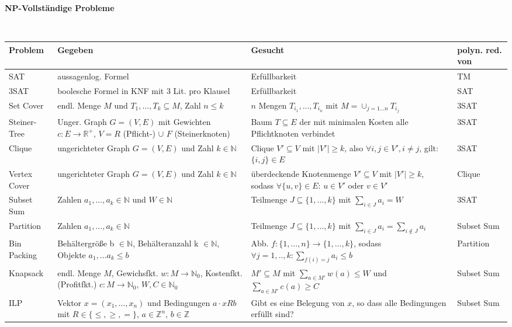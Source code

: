 \documentclass{article}
\newcommand{\h}[1]{\vspace{1ex}\begin{center}\small\textbf{#1}\end{center}}
\begin{document}
\pagebreak
\scriptsize\raggedright
\h{NP-Vollständige Probleme}\
		\begin{tabular}{p{1.6cm}p{6cm}p{6cm}p{1.8cm}}
		Problem 		&		Gegeben		&		Gesucht		& polyn. red. von \\ \hline
		SAT					& aussagenlog. Formel & Erfüllbarkeit & TM\\
		3SAT				& boolesche Formel in KNF mit 3 Lit. pro Klausel & Erfüllbarkeit & SAT \\
		Set Cover		& endl. Menge $M$ und $T_1,...,T_k \subseteq M$, Zahl $n \leq k$	&  $n$ Mengen $T_{i_1},...,T_{i_n}$ mit $M=\cup_{j=1\ldots n}T_{i_j}$ & 3SAT \\
		Steiner-Tree& Unger.	Graph $G=(V,E)$ mit Gewichten $c:E \rightarrow \mathbb{R}^+$, $V=R$ (Pflicht-) $\cup$ $F$ (Steinerknoten)	&	Baum $T \subseteq E$ der mit minimalen Kosten alle Pflichtknoten verbindet& 3SAT \\
		Clique			&	ungerichteter Graph $G=(V,E)$ und Zahl $k \in \mathbb{N}$ & Clique $V'\subseteq V$ mit $|V'|\ge k$, also $\forall i,j \in V', i \neq j$, gilt: $\{i,j\} \in E$ & 3SAT \\
		Vertex Cover&	ungerichteter Graph $G=(V,E)$ und Zahl $k \in \mathbb{N}$ &	überdeckende Knotenmenge $V'\subseteq V$ mit $\left| V' \right| \geq k$, sodass $\forall \{u,v\} \in E$: $u \in V'$ oder $v \in V'$	& Clique \\
		Subset Sum & Zahlen $a_1,...,a_k \in \mathbb{N}$ und $W \in \mathbb{N}$ &	Teilmenge $J \subseteq \{1,...,k \}$ mit $\sum_{i \in J}{a_i}=W$ & 3SAT \\ 
		Partition		&	Zahlen $a_1,...,a_k \in \mathbb{N}$ &	Teilmenge $J \subseteq \{1,...,k \}$ mit $\sum_{i \in J}{a_i}=\sum_{i \notin J}{a_i}$	& Subset Sum \\
		Bin Packing &	Behältergröße b $\in \mathbb{N}$, Behälteranzahl k $\in \mathbb{N}$, Objekte $a_1,...a_k \leq b$ & Abb. $f: \{1,...,n\}\rightarrow \{1,...,k\}$, sodass $\forall j=1,..,k: \sum_{f(i)=j}{a_i \leq b}$	& Partition \\
		Knapsack		&	endl. Menge $M$, Gewichsfkt. $w:M \rightarrow \mathbb{N}_0$, Kostenfkt. (Profitfkt.) $c:M \rightarrow \mathbb{N}_0$, $W,C \in \mathbb{N}_0$ & $M' \subseteq M$ mit $\sum_{a \in M'}{w(a)} \leq W$ und $\sum_{a \in M'}{c(a)} \geq C$ & Subset Sum \\
		ILP					&	Vektor $x=(x_1,\ldots,x_n)$ und Bedingungen $a\cdot x R b$ mit $R\in\{\le,\ge,=\}$, $a\in\mathbb{Z}^n$, $b\in\mathbb{Z}$   & Gibt es eine Belegung von $x$, so dass alle Bedingungen erfüllt sind?	& Subset Sum \\

\end{tabular}
\end{document}
